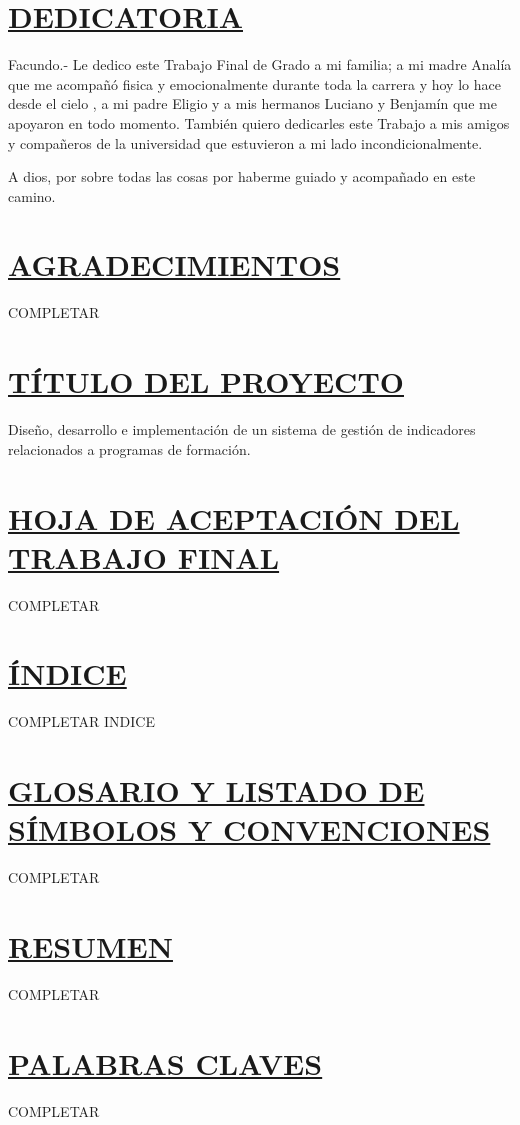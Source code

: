 \section*{\centering \underline{DEDICATORIA}}

Facundo.- Le dedico este Trabajo Final de Grado a mi familia; a mi madre Analía que me acompañó fisica y emocionalmente durante toda la carrera y hoy lo hace desde el cielo , a mi padre Eligio y a mis hermanos Luciano y Benjamín que me apoyaron en todo momento. 
También quiero dedicarles este Trabajo a mis amigos y compañeros de la universidad que estuvieron a mi lado incondicionalmente.

A dios, por sobre todas las cosas por haberme guiado y acompañado en este camino.
\newpage

\section*{\centering \underline{AGRADECIMIENTOS}}
COMPLETAR \\
\newpage
\section*{\underline{TÍTULO DEL PROYECTO}}
Diseño, desarrollo e implementación de un sistema de gestión de indicadores relacionados a programas de formación.\\
\section*{\underline{HOJA DE ACEPTACIÓN DEL TRABAJO FINAL}}
COMPLETAR \\
\section*{\underline{ÍNDICE}}
COMPLETAR INDICE

\section*{\underline{GLOSARIO Y LISTADO DE SÍMBOLOS Y CONVENCIONES}}
COMPLETAR \\
\section*{\underline{RESUMEN}}
COMPLETAR \\
\section*{\underline{PALABRAS CLAVES}}
COMPLETAR

